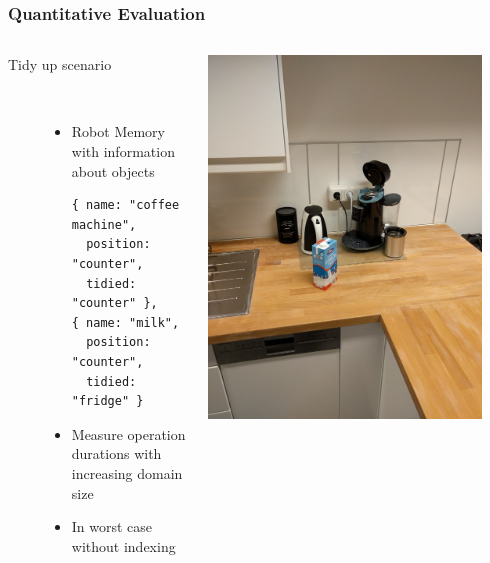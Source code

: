 \begin{frame}[fragile]
  \frametitle{Quantitative Evaluation}
  \begin{columns}
    \begin{column}{0.55\textwidth}
      \begin{description}
      \item[Tidy up scenario] \hfill \\
        \begin{itemize}
        \item Robot Memory with information about objects
          \begin{lstlisting}[style=SmallJSON,
            framexleftmargin=5pt, xleftmargin=0pt,
            morekeywords={}, numbers=none]
{ name: "coffee machine",
  position: "counter",
  tidied: "counter" },
{ name: "milk",
  position: "counter",
  tidied: "fridge" }
          \end{lstlisting}
        \item Measure operation durations with increasing domain size
        \item In worst case without indexing
        \end{itemize}
      \end{description}
    \end{column}
    \begin{column}{0.45\textwidth}
      \centering
    \includegraphics[width=0.9\textwidth]{../thesis/img/tidy-up}\\
    \end{column}
  \end{columns}
\end{frame}

